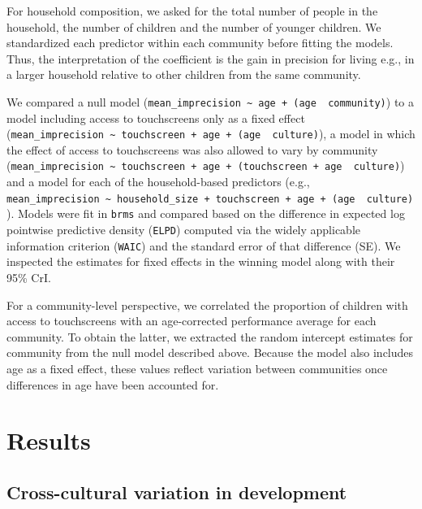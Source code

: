 \documentclass[
  man,floatsintext]{apa7}
\begin{document}
For household composition, we asked for the total number of people in the household, the number of children and the number of younger children. We standardized each predictor within each community before fitting the models. Thus, the interpretation of the coefficient is the gain in precision for living e.g., in a larger household relative to other children from the same community.

We compared a null model (\texttt{mean\_imprecision\ \textasciitilde{}\ age\ +\ (age\ \textbar{}\ community)}) to a model including access to touchscreens only as a fixed effect (\texttt{mean\_imprecision\ \textasciitilde{}\ touchscreen\ +\ age\ +\ (age\ \textbar{}\ culture)}), a model in which the effect of access to touchscreens was also allowed to vary by community (\texttt{mean\_imprecision\ \textasciitilde{}\ touchscreen\ +\ age\ +\ (touchscreen\ +\ age\ \textbar{}\ culture)}) and a model for each of the household-based predictors (e.g., \texttt{mean\_imprecision\ \textasciitilde{}\ household\_size\ +\ touchscreen\ +\ age\ +\ (age\ \textbar{}\ culture)}). Models were fit in \texttt{brms} and compared based on the difference in expected log pointwise predictive density (\texttt{ELPD}) computed via the widely applicable information criterion (\texttt{WAIC}) and the standard error of that difference (SE). We inspected the estimates for fixed effects in the winning model along with their 95\% CrI.

For a community-level perspective, we correlated the proportion of children with access to touchscreens with an age-corrected performance average for each community. To obtain the latter, we extracted the random intercept estimates for community from the null model described above. Because the model also includes age as a fixed effect, these values reflect variation between communities once differences in age have been accounted for.

\hypertarget{results}{%
\section{Results}\label{results}}

\hypertarget{cross-cultural-variation-in-development}{%
\subsection{Cross-cultural variation in development}\label{cross-cultural-variation-in-development}}
\end{document}
